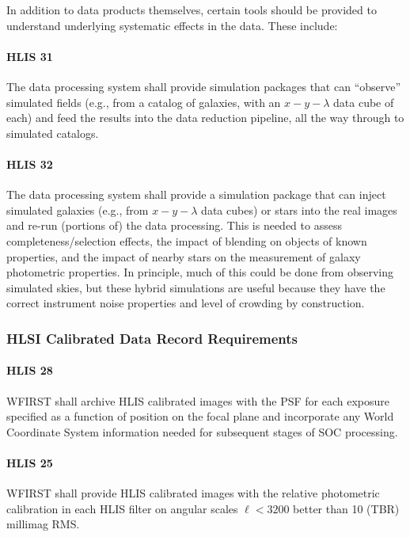 In addition to data products themselves, certain tools should be provided to
understand underlying systematic effects in the data. These include:

\paragraph{HLIS 31} The data processing system shall provide simulation packages that can
“observe” simulated fields (e.g., from a catalog of galaxies, with an $x-y-\lambda$ data
cube of each) and feed the results into the data reduction pipeline, all the way
through to simulated catalogs.

\paragraph{HLIS 32} The data processing system shall provide a simulation package that can
inject simulated galaxies (e.g., from $x-y-\lambda$ data cubes) or stars into the real
images and re-run (portions of) the data processing. This is needed to assess
completeness/selection effects, the impact of blending on objects of known
properties, and the impact of nearby stars on the measurement of galaxy
photometric properties. In principle, much of this could be done from observing
simulated skies, but these hybrid simulations are useful because they have the
correct instrument noise properties and level of crowding by construction.

\subsubsection{HLSI Calibrated Data Record Requirements}

\paragraph{HLIS 28} WFIRST shall archive HLIS calibrated images with the PSF for each
exposure specified as a function of position on the focal plane and incorporate
any World Coordinate System information needed for subsequent stages of SOC
processing.

\paragraph{HLIS 25} WFIRST shall provide HLIS calibrated images with the relative
photometric calibration in each HLIS filter on angular scales $\ell < 3200$ better than
10 (TBR) millimag RMS.

